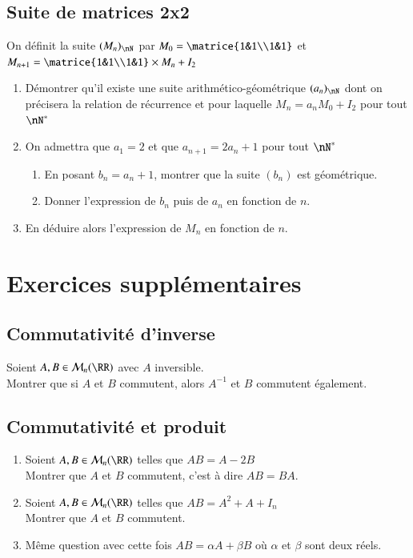 \documentclass[oneside,12pt]{article}          %
\begin{document}
\subsection{Suite de matrices 2x2}
On définit la suite $(M_n)_\nN$ par $M_0=\matrice{1&1\\1&1}$ et $M_{n+1}=\matrice{1&1\\1&1}\times M_n +I_2$

\begin{enumerate}
	\item Démontrer qu'il existe une suite arithmético-géométrique $(a_n)_\nN$ dont on précisera la relation de récurrence et pour laquelle $M_n=a_nM_0+I_2$ pour tout $\nN^*$
	\item On admettra que $a_1=2$ et que $a_{n+1}=2a_n+1$ pour tout $\nN^*$
	\begin{enumerate}
		\item En posant $b_n=a_n+1$, montrer que la suite $(b_n)$ est géométrique.
		\item Donner l'expression de $b_n$ puis de $a_n$ en fonction de $n$.
	\end{enumerate}
	\item En déduire alors l'expression de $M_n$ en fonction de $n$.
\end{enumerate}



\section{Exercices supplémentaires}

\subsection{Commutativité d'inverse}
Soient $A,B\in\mathcal{M}_n(\RR)$ avec $A$ inversible.\\
Montrer que si $A$ et $B$ commutent, alors $A^{-1}$ et $B$ commutent également.



\subsection{Commutativité et produit}
\begin{enumerate}
    \item Soient $A,B\in\mathcal{M}_n(\RR)$ telles que $AB=A-2B$\\ 
    Montrer que $A$ et $B$ commutent, c'est à dire $AB=BA$.
    \item Soient $A,B\in\mathcal{M}_n(\RR)$ telles que $AB=A^2+A+I_n$ \\
	Montrer que $A$ et $B$ commutent.
    \item Même question avec cette fois $AB=\alpha A + \beta B$ où $\alpha$ et $\beta$ sont deux réels.
\end{enumerate}
\end{document}
